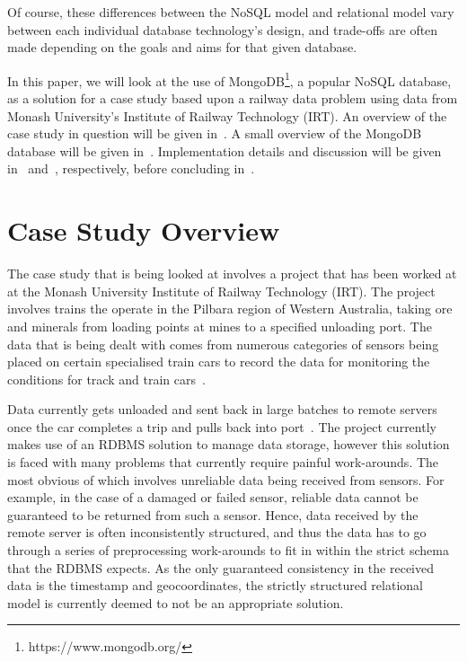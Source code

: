 \documentclass[a4paper,11pt]{article}
\begin{document}
Of course, these differences between the NoSQL model and relational model vary between each individual database
technology's design, and trade-offs are often made depending on the goals and aims for that given database.

In this paper, we will look at the use of MongoDB\footnote{https://www.mongodb.org/}, a popular NoSQL database,
as a solution for a case study based upon a railway data problem using data from Monash University's Institute of Railway
Technology (IRT). An overview of the case study in question will be given in~. A small
overview of the MongoDB database will be given in~. Implementation details and
discussion will be given in~ and~, respectively,
before concluding in~.


\newpage

\section{Case Study Overview} %
\label{sec:case_study_overview}

The case study that is being looked at involves a project that has been worked at at the Monash University Institute of
Railway Technology (IRT). The project involves trains the operate in the Pilbara region of Western Australia, taking
ore and minerals from loading points at mines to a specified unloading port. The data that is being dealt with comes from
numerous categories of sensors being placed on certain specialised train cars to record the data for monitoring the conditions
for track and train cars~\cite{darby2003development,darby2005track}.

Data currently gets unloaded and sent back in large batches to remote servers once the car completes a trip and pulls back
into port~\cite{thomas2012taking}. The project currently makes use of an RDBMS solution to manage data storage, however
this solution is faced with many problems that currently require painful work-arounds. The most obvious of which involves
unreliable data being received from sensors. For example, in the case of a damaged or failed sensor, reliable data cannot
be guaranteed to be returned from such a sensor. Hence, data received by the remote server is often inconsistently
structured, and thus the data has to go through a series of preprocessing work-arounds to fit in within the strict
schema that the RDBMS expects. As the only guaranteed consistency in the received data is the timestamp and
geocoordinates, the strictly structured relational model is currently deemed to not be an appropriate solution.
\end{document}
